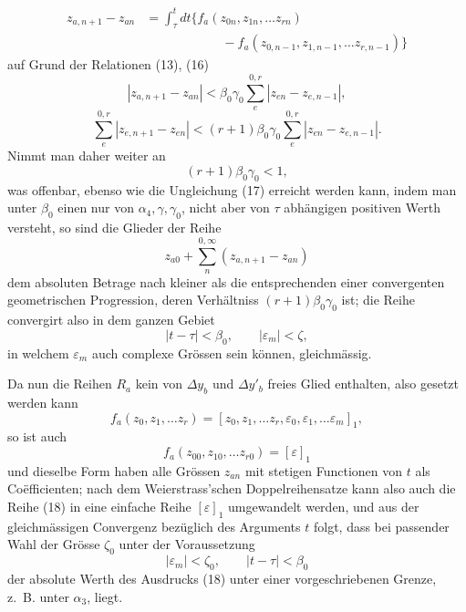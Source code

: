 \documentclass[11pt,a4paper,leqno]{article}
\begin{document}
\[
\begin{aligned}
z_{a,n+1}-z_{an}
&=\int_\tau^t dt\bigl\{f_a(z_{0n},z_{1n},\ldots z_{rn})\\
&\hspace{6em}-f_a(z_{0,n-1},z_{1,n-1},\ldots z_{r,n-1})\bigr\}
\end{aligned}
\]
auf Grund der Relationen (13), (16)
\[
|z_{a,n+1}-z_{an}|<\beta_0\gamma_0
\sum_e^{0,r}|z_{en}-z_{e,n-1}|,
\]
\[
\sum_e^{0,r}|z_{e,n+1}-z_{en}|<(r+1)\beta_0\gamma_0
\sum_e^{0,r}|z_{en}-z_{e,n-1}|.
\]
Nimmt man daher weiter an
\[
(r+1)\beta_0\gamma_0<1,
\]
was offenbar, ebenso wie die Ungleichung (17) erreicht werden kann,
indem man unter $\beta_0$ einen nur von $\alpha_4,\gamma,\gamma_0$, nicht
aber von $\tau$ abhängigen positiven Werth versteht, so sind die Glieder
der Reihe
\begin{equation}\tag{18}
z_{a0}+\sum_n^{0,\infty}(z_{a,n+1}-z_{an})
\end{equation}
dem absoluten Betrage nach kleiner als die entsprechenden einer
convergenten geometrischen Progression, deren Verhältniss
$(r+1)\beta_0\gamma_0$ ist; die Reihe convergirt also in dem ganzen
Gebiet
\[
|t-\tau|<\beta_0,\qquad |\varepsilon_m|<\zeta,
\]
in welchem $\varepsilon_m$ auch complexe Grössen sein können,
gleichmässig.

Da nun die Reihen $R_a$ kein von $\Delta y_b$ und $\Delta y'_b$ freies
Glied enthalten, also gesetzt werden kann
\[
f_a(z_0,z_1,\ldots z_r)
=[z_0,z_1,\ldots z_r,\varepsilon_0,\varepsilon_1,\ldots\varepsilon_m]_1,
\]
so ist auch
\[
f_a(z_{00},z_{10},\ldots z_{r0})=[\varepsilon]_1
\]
und dieselbe Form haben alle Grössen $z_{an}$ mit stetigen Functionen
von $t$ als Coëfficienten; nach dem Weierstrass'schen Doppelreihensatze
kann also auch die Reihe (18) in eine einfache Reihe $[\varepsilon]_1$
umgewandelt werden, und aus der gleichmässigen Convergenz bezüglich des
Arguments $t$ folgt, dass bei passender Wahl der Grösse $\zeta_0$ unter
der Voraussetzung
\begin{equation}\tag{19}
|\varepsilon_m|<\zeta_0,\qquad |t-\tau|<\beta_0
\end{equation}
der absolute Werth des Ausdrucks (18) unter einer vorgeschriebenen
Grenze, z.~B. unter $\alpha_3$, liegt.
\end{document}
